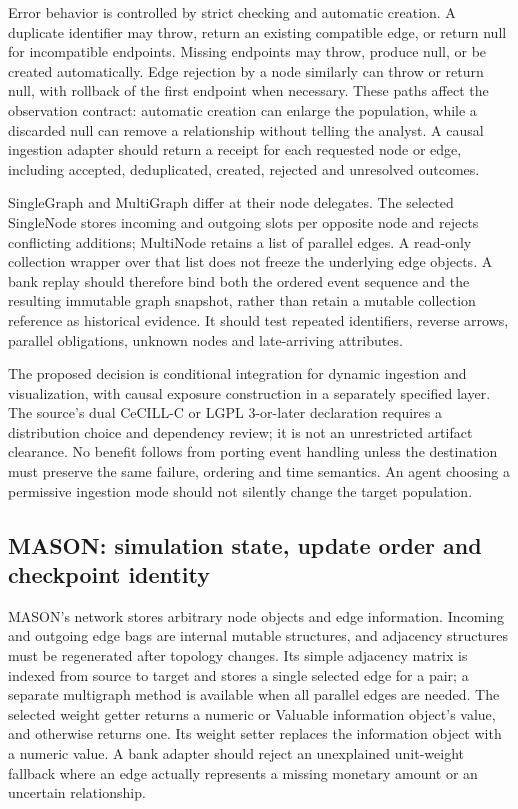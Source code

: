 Error behavior is controlled by strict checking and automatic creation. A duplicate identifier may throw, return an existing compatible edge, or return null for incompatible endpoints. Missing endpoints may throw, produce null, or be created automatically. Edge rejection by a node similarly can throw or return null, with rollback of the first endpoint when necessary. These paths affect the observation contract: automatic creation can enlarge the population, while a discarded null can remove a relationship without telling the analyst. A causal ingestion adapter should return a receipt for each requested node or edge, including accepted, deduplicated, created, rejected and unresolved outcomes.~\citep{exec25_jnet_graphstream}

SingleGraph and MultiGraph differ at their node delegates. The selected SingleNode stores incoming and outgoing slots per opposite node and rejects conflicting additions; MultiNode retains a list of parallel edges. A read-only collection wrapper over that list does not freeze the underlying edge objects. A bank replay should therefore bind both the ordered event sequence and the resulting immutable graph snapshot, rather than retain a mutable collection reference as historical evidence. It should test repeated identifiers, reverse arrows, parallel obligations, unknown nodes and late-arriving attributes.~\citep{exec25_jnet_graphstream}

The proposed decision is conditional integration for dynamic ingestion and visualization, with causal exposure construction in a separately specified layer. The source's dual CeCILL-C or LGPL 3-or-later declaration requires a distribution choice and dependency review; it is not an unrestricted artifact clearance. No benefit follows from porting event handling unless the destination must preserve the same failure, ordering and time semantics. An agent choosing a permissive ingestion mode should not silently change the target population.~\citep{exec25_jnet_graphstream,exec25_jnet_choice}

\subsection{MASON: simulation state, update order and checkpoint identity}

MASON's network stores arbitrary node objects and edge information. Incoming and outgoing edge bags are internal mutable structures, and adjacency structures must be regenerated after topology changes. Its simple adjacency matrix is indexed from source to target and stores a single selected edge for a pair; a separate multigraph method is available when all parallel edges are needed. The selected weight getter returns a numeric or Valuable information object's value, and otherwise returns one. Its weight setter replaces the information object with a numeric value. A bank adapter should reject an unexplained unit-weight fallback where an edge actually represents a missing monetary amount or an uncertain relationship.~\citep{exec25_jnet_mason}

